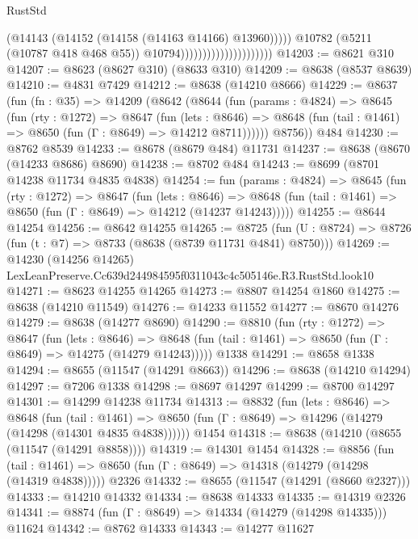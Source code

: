 \begin{lexlean}{RustStd}
\begin{coremodule}
                                                  (@14143
                                                    (@14152 (@14158 (@14163 @14166) @13960)))))
                                              @10782
                                              (@5211 (@10787 @418 @468 @55))
                                              @10794)))))))))))))))))))))
@14203 := @8621 @310
@14207 := @8623 (@8627 @310) (@8633 @310)
@14209 := @8638 (@8537 @8639)
@14210 := @4831 @7429
@14212 := @8638 (@14210 @8666)
@14229 := @8637
    (fun (fn : @35) =>
    @14209
      (@8642
        (@8644
          (fun (params : @4824) =>
          @8645
            (fun (rty : @1272) =>
            @8647
              (fun (lets : @8646) =>
              @8648 (fun (tail : @1461) => @8650 (fun (Γ : @8649) => @14212 @8711))))))
        @8756))
    @484
@14230 := @8762 @8539
@14233 := @8678 (@8679 @484) @11731
@14237 := @8638 (@8670 (@14233 @8686) @8690)
@14238 := @8702 @484
@14243 := @8699 (@8701 @14238 @11734 @4835 @4838)
@14254 := fun (params : @4824) =>
  @8645
    (fun (rty : @1272) =>
    @8647
      (fun (lets : @8646) =>
      @8648 (fun (tail : @1461) => @8650 (fun (Γ : @8649) => @14212 (@14237 @14243)))))
@14255 := @8644 @14254
@14256 := @8642 @14255
@14265 := @8725
    (fun (U : @8724) => @8726 (fun (t : @7) => @8733 (@8638 (@8739 @11731 @4841) @8750)))
@14269 := @14230 (@14256 @14265) LexLeanPreserve.Cc639d244984595f0311043c4c505146e.R3.RustStd.look10
@14271 := @8623 @14255 @14265
@14273 := @8807 @14254 @1860
@14275 := @8638 (@14210 @11549)
@14276 := @14233 @11552
@14277 := @8670 @14276
@14279 := @8638 (@14277 @8690)
@14290 := @8810
    (fun (rty : @1272) =>
    @8647
      (fun (lets : @8646) =>
      @8648 (fun (tail : @1461) => @8650 (fun (Γ : @8649) => @14275 (@14279 @14243)))))
    @1338
@14291 := @8658 @1338
@14294 := @8655 (@11547 (@14291 @8663))
@14296 := @8638 (@14210 @14294)
@14297 := @7206 @1338
@14298 := @8697 @14297
@14299 := @8700 @14297
@14301 := @14299 @14238 @11734
@14313 := @8832
    (fun (lets : @8646) =>
    @8648
      (fun (tail : @1461) =>
      @8650 (fun (Γ : @8649) => @14296 (@14279 (@14298 (@14301 @4835 @4838))))))
    @1454
@14318 := @8638 (@14210 (@8655 (@11547 (@14291 @8858))))
@14319 := @14301 @1454
@14328 := @8856
    (fun (tail : @1461) => @8650 (fun (Γ : @8649) => @14318 (@14279 (@14298 (@14319 @4838)))))
    @2326
@14332 := @8655 (@11547 (@14291 (@8660 @2327)))
@14333 := @14210 @14332
@14334 := @8638 @14333
@14335 := @14319 @2326
@14341 := @8874 (fun (Γ : @8649) => @14334 (@14279 (@14298 @14335))) @11624
@14342 := @8762 @14333
@14343 := @14277 @11627

\end{coremodule}
\end{lexlean}

